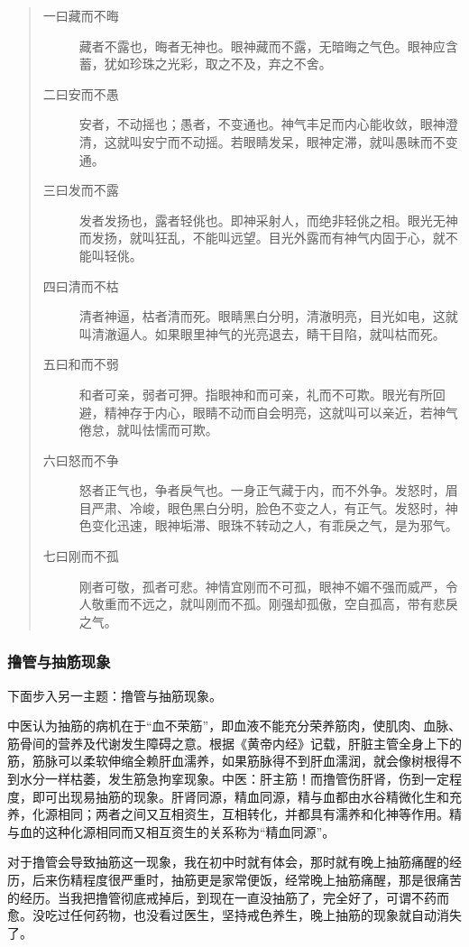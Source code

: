 \begin{quotation}
    \begin{description}
        \item[一曰藏而不晦] 藏者不露也，晦者无神也。眼神藏而不露，无暗晦之气色。眼神应含蓄，犹如珍珠之光彩，取之不及，弃之不舍。
        \item[二曰安而不愚] 安者，不动摇也；愚者，不变通也。神气丰足而内心能收敛，眼神澄清，这就叫安宁而不动摇。若眼睛发呆，眼神定滞，就叫愚昧而不变通。
        \item[三曰发而不露] 发者发扬也，露者轻佻也。即神采射人，而绝非轻佻之相。眼光无神而发扬，就叫狂乱，不能叫远望。目光外露而有神气内固于心，就不能叫轻佻。
        \item[四曰清而不枯] 清者神逼，枯者清而死。眼睛黑白分明，清澈明亮，目光如电，这就叫清澈逼人。如果眼里神气的光亮退去，睛干目陷，就叫枯而死。
        \item[五曰和而不弱] 和者可亲，弱者可狎。指眼神和而可亲，礼而不可欺。眼光有所回避，精神存于内心，眼睛不动而自会明亮，这就叫可以亲近，若神气倦怠，就叫怯懦而可欺。
        \item[六曰怒而不争] 怒者正气也，争者戾气也。一身正气藏于内，而不外争。发怒时，眉目严肃、冷峻，眼色黑白分明，脸色不变之人，有正气。发怒时，神色变化迅速，眼神垢滞、眼珠不转动之人，有乖戾之气，是为邪气。
        \item[七曰刚而不孤] 刚者可敬，孤者可悲。神情宜刚而不可孤，眼神不媚不强而威严，令人敬重而不远之，就叫刚而不孤。刚强却孤傲，空自孤高，带有悲戾之气。
    \end{description}
\end{quotation}

\subsubsection{撸管与抽筋现象}

下面步入另一主题：撸管与抽筋现象。

中医认为抽筋的病机在于“血不荣筋”，即血液不能充分荣养筋肉，使肌肉、血脉、筋骨间的营养及代谢发生障碍之意。根据《黄帝内经》记载，肝脏主管全身上下的筋，筋脉可以柔软伸缩全赖肝血濡养，如果筋脉得不到肝血濡润，就会像树根得不到水分一样枯萎，发生筋急拘挛现象。中医：肝主筋！而撸管伤肝肾，伤到一定程度，即可出现易抽筋的现象。肝肾同源，精血同源，精与血都由水谷精微化生和充养，化源相同；两者之间又互相资生，互相转化，并都具有濡养和化神等作用。精与血的这种化源相同而又相互资生的关系称为“精血同源”。

对于撸管会导致抽筋这一现象，我在初中时就有体会，那时就有晚上抽筋痛醒的经历，后来伤精程度很严重时，抽筋更是家常便饭，经常晚上抽筋痛醒，那是很痛苦的经历。当我把撸管彻底戒掉后，到现在一直没抽筋了，完全好了，可谓不药而愈。没吃过任何药物，也没看过医生，坚持戒色养生，晚上抽筋的现象就自动消失了。

